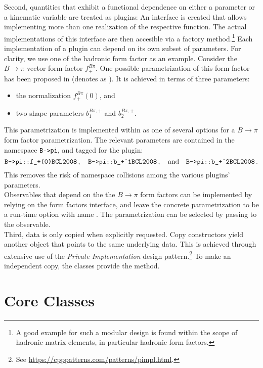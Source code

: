 Second, quantities that exhibit a functional dependence on either a parameter or
a kinematic variable are treated as plugins: An interface is created that
allows implementing more than one realization of the respective function.
The actual implementations of this interface are then accesible
via a factory method.\footnote{%
    A good example for such a modular design is found within the scope of
    hadronic matrix elements, in particular hadronic form factors.
}
Each implementation of a plugin can depend on its own subset of parameters. For
clarity, we use one of the hadronic form factor as an example.
Consider the $B\to \pi$ vector form factor $f^{B\pi}_+$. One possible
parametrization of this form factor has been proposed in \cite{Bourrely:2008za}
(denotes as ). It is achieved in terms of three parameters:
\begin{itemize}
    \item the normalization $f^{B\pi}_+(0)$, and
    \item two shape parameters $b^{B\pi,+}_1$ and $b^{B\pi,+}_2$.
\end{itemize}
This parametrization is implemented within \ctg as one of several options for
a $B\to \pi$ form factor parametrization.
The relevant \ctg parameters are contained in the
namespace \texttt{B->pi}, and tagged for the  plugin:
\begin{equation}
    \texttt{B->pi::f\_+(0)\@BCL2008}\,,\quad\texttt{B->pi::b\_+\^{}1\@BCL2008}\,,
    \quad\text{and}\quad\texttt{B->pi::b\_+\^{}2\@BCL2008}\,.
\end{equation}
This removes the risk of namespace collisions among the various plugins'
parameters.\\
Observables that depend on the the $B\to \pi$ form factors can be
implemented by relying on the form factors interface, and leave the concrete
parametrization to be a run-time option with name .  The
 parametrization can be selected by passing
 to the observable.\\


Third, data is only copied when explicitly requested. Copy constructors yield
another object that points to the same underlying data. This is achieved through
extensive use of the \emph{Private Implementation} design pattern.\footnote{%
    See \url{https://cpppatterns.com/patterns/pimpl.html}.
}
To make an independent copy, the \ctg classes provide the  method.


\section{Core Classes}
\label{sec:interface:classes}

